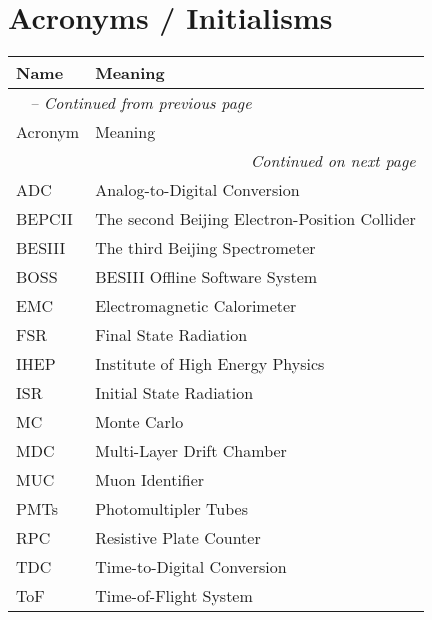 \pagebreak

\section{Acronyms / Initialisms}
\label{sec:acronym}


\begin{longtable}{p{} p{}}
\label{tab:acronyms} \\

\toprule
Name & Meaning \\
\midrule
\endfirsthead

\multicolumn{2}{l}{\textit{\tablename\ \thetable{} -- Continued from previous page}} \\
\toprule
Acronym & Meaning \\
\midrule
\endhead

\multicolumn{2}{r}{\textit{Continued on next page}} \\
\bottomrule
\endfoot

\bottomrule
\endlastfoot


    ADC    & Analog-to-Digital Conversion \\
    BEPCII & The second Beijing Electron-Position Collider \\
    BESIII & The third Beijing Spectrometer \\
    BOSS   & BESIII Offline Software System \\
    EMC    & Electromagnetic Calorimeter \\
    FSR    & Final State Radiation \\
    IHEP   & Institute of High Energy Physics \\
    ISR    & Initial State Radiation \\
    MC     & Monte Carlo \\
    MDC    & Multi-Layer Drift Chamber \\
    MUC    & Muon Identifier \\
    PMTs   & Photomultipler Tubes \\
    RPC    & Resistive Plate Counter \\
    TDC    & Time-to-Digital Conversion \\
    ToF    & Time-of-Flight System \\
\end{longtable}
